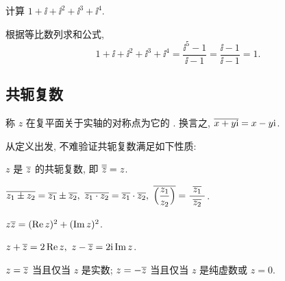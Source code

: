 \begin{example}
  计算 $1+\ii+\ii^2+\ii^3+\ii^4$.
\end{example}

\begin{solution}
  根据等比数列求和公式,
  \[
     1+\ii+\ii^2+\ii^3+\ii^4
    =\frac{\ii^5-1}{\ii-1}
    =\frac{\ii-1}{\ii-1}
    =1.
  \]
\end{solution}


\subsection{共轭复数}


\begin{definition}
  称 $z$ 在复平面关于实轴的对称点为它的 .
  换言之, $\overline{x+y\mathrm{i}}=x-y\mathrm{i}$.
\end{definition}

从定义出发, 不难验证共轭复数满足如下性质:
\begin{enuma}
  \item $z$ 是 $\overline z$ 的共轭复数, 即 $\overline{\overline z}=z$.
  \label{enum:conjugate-zbarbar}
  \item $\ov{z_1\pm z_2}=\ov{z_1}\pm\ov{z_2},\ 
  \ov{z_1\cdot z_2}=\ov{z_1}\cdot\ov{z_2},\ 
  \ov{\Bigl(\dfrac{z_1}{z_2}\Bigr)}=\dfrac{~\ov{z_1}~}{~\ov{z_2}~}$.
  \label{enum:conjugate-commutes}
  \item $z\overline{z}=(\operatorname{Re} z)^2+(\operatorname{Im} z)^2$.
  \item $z+\overline z=2\operatorname{Re} z,\ z-\overline z=2\mathrm{i}\operatorname{Im} z$.
  \label{enum:conjugate-xy-zzbar}
  \item $z=\overline z$ 当且仅当 $z$ 是实数; $z=-\overline z$ 当且仅当 $z$ 是纯虚数或 $z=0$.
  \label{enum:conjugate-real-imag}
\end{enuma}

